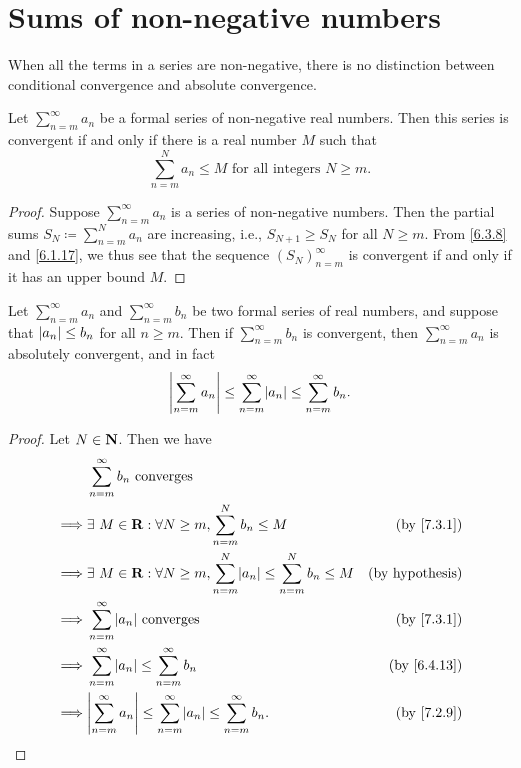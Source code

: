 \section{Sums of non-negative numbers}\label{sec 7.3}

\begin{note}
  When all the terms in a series are non-negative, there is no distinction between conditional convergence and absolute convergence.
\end{note}

\begin{proposition}\label{7.3.1}
  Let \(\sum_{n = m}^\infty a_n\) be a formal series of non-negative real numbers.
  Then this series is convergent if and only if there is a real number \(M\) such that
  \[
    \sum_{n = m}^N a_n \leq M \text{ for all integers } N \geq m.
  \]
\end{proposition}

\begin{proof}
  Suppose \(\sum_{n = m}^\infty a_n\) is a series of non-negative numbers.
  Then the partial sums \(S_N \coloneqq \sum_{n = m}^N a_n\) are increasing, i.e., \(S_{N + 1} \geq S_N\) for all \(N \geq m\).
  From \cref{6.3.8} and \cref{6.1.17}, we thus see that the sequence \((S_N)_{n = m}^\infty\) is convergent if and only if it has an upper bound \(M\).
\end{proof}

\begin{corollary}\label{7.3.2}
  Let \(\sum_{n = m}^\infty a_n\) and \(\sum_{n = m}^\infty b_n\) be two formal series of real numbers, and suppose that \(\left\lvert a_n\right\rvert \leq b_n\) for all \(n \geq m\).
  Then if \(\sum_{n = m}^\infty b_n\) is convergent, then \(\sum_{n = m}^\infty a_n\) is absolutely convergent, and in fact
  \[
    \abs{\sum_{n = m}^\infty a_n} \leq \sum_{n = m}^\infty \abs{a_n} \leq \sum_{n = m}^\infty b_n.
  \]
\end{corollary}

\begin{proof}
  Let \(N \in \mathbf{N}\).
  Then we have
  \begin{align*}
             & \sum_{n = m}^\infty b_n \text{ converges}                                                                                  \\
    \implies & \exists\ M \in \R : \forall N \geq m, \sum_{n = m}^N b_n \leq M                                & \text{(by \cref{7.3.1})}  \\
    \implies & \exists\ M \in \R : \forall N \geq m, \sum_{n = m}^N \abs{a_n} \leq \sum_{n = m}^N b_n \leq M  & \text{(by hypothesis)}    \\
    \implies & \sum_{n = m}^\infty \abs{a_n} \text{ converges}                                                & \text{(by \cref{7.3.1})}  \\
    \implies & \sum_{n = m}^\infty \abs{a_n} \leq \sum_{n = m}^\infty b_n                                     & \text{(by \cref{6.4.13})} \\
    \implies & \abs{\sum_{n = m}^\infty a_n} \leq \sum_{n = m}^\infty \abs{a_n} \leq \sum_{n = m}^\infty b_n. & \text{(by \cref{7.2.9})}
  \end{align*}
\end{proof}

